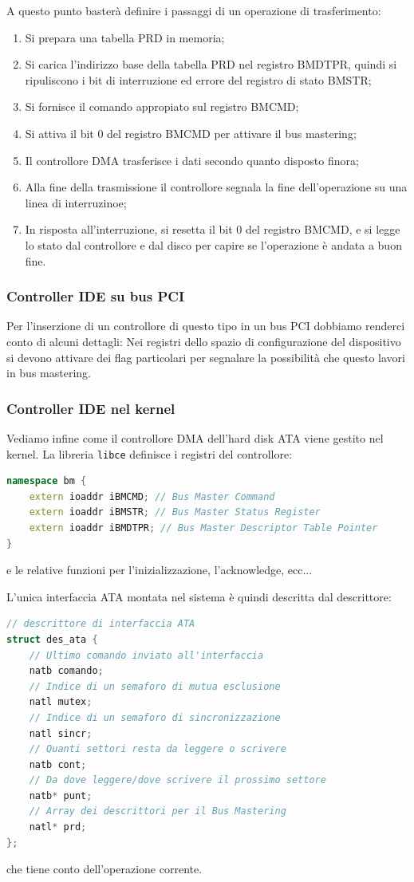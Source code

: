 \documentclass[a4paper,11pt]{article}
\begin{document}
A questo punto basterà definire i passaggi di un operazione di trasferimento:
\begin{enumerate}
	\item Si prepara una tabella PRD in memoria;
	\item Si carica l'indirizzo base della tabella PRD nel registro BMDTPR, quindi si ripuliscono i bit di interruzione ed errore del registro di stato BMSTR;
	\item Si fornisce il comando appropiato sul registro BMCMD;
	\item Si attiva il bit 0 del registro BMCMD per attivare il bus mastering;
	\item Il controllore DMA trasferisce i dati secondo quanto disposto finora;
	\item Alla fine della trasmissione il controllore segnala la fine dell'operazione su una linea di interruzinoe;
	\item In risposta all'interruzione, si resetta il bit 0 del registro BMCMD, e si legge lo stato dal controllore e dal disco per capire se l'operazione è andata a buon fine.
\end{enumerate}

\subsubsection{Controller IDE su bus PCI}
Per l'inserzione di un controllore di questo tipo in un bus PCI dobbiamo renderci conto di alcuni dettagli:
Nei registri dello spazio di configurazione del dispositivo si devono attivare dei flag particolari per segnalare la possibilità che questo lavori in bus mastering.

\subsubsection{Controller IDE nel kernel}
Vediamo infine come il controllore DMA dell'hard disk ATA viene gestito nel kernel.
La libreria \lstinline|libce| definisce i registri del controllore:
\begin{lstlisting}[language=C++, style=codestyle]	
namespace bm {
	extern ioaddr iBMCMD; // Bus Master Command
	extern ioaddr iBMSTR; // Bus Master Status Register
	extern ioaddr iBMDTPR; // Bus Master Descriptor Table Pointer
}
\end{lstlisting}
e le relative funzioni per l'inizializzazione, l'acknowledge, ecc...

L'unica interfaccia ATA montata nel sistema è quindi descritta dal descrittore:
\begin{lstlisting}[language=C++, style=codestyle]	
// descrittore di interfaccia ATA
struct des_ata {
	// Ultimo comando inviato all'interfaccia
	natb comando;
	// Indice di un semaforo di mutua esclusione
	natl mutex;
	// Indice di un semaforo di sincronizzazione
	natl sincr;
	// Quanti settori resta da leggere o scrivere
	natb cont;
	// Da dove leggere/dove scrivere il prossimo settore
	natb* punt;
	// Array dei descrittori per il Bus Mastering
	natl* prd;
};
\end{lstlisting}
che tiene conto dell'operazione corrente.
\end{document}
